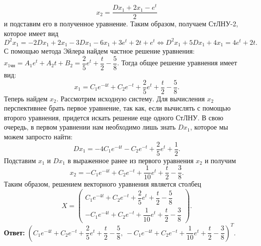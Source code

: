 \documentclass[a4paper, 12pt]{article}
\begin{document}
$$x_2 = \dfrac{Dx_1 + 2x_1 - e^t}{2}$$
и подставим его в полученное уравнение. Таким образом, получаем СтЛНУ-2, которое имеет вид
$$D^2x_1 = -2Dx_1 + 2x_1 - 3Dx_1 -6x_1 + 3e^t + 2t + e^t\Longleftrightarrow D^2x_1 + 5Dx_1 + 4x_1 = 4e^t + 2t.$$
С помощью метода Эйлера найдем частное решение уравнения: $x_{1\text{чн}} = A_1e^t + A_2t + B_2 = \dfrac{2}{5}e^t + \dfrac{t}{2} - \dfrac{5}{8}.$ Тогда общее решение уравнения имеет вид:
$$x_1 = C_1e^{-4t} + C_2e^{-t} + \dfrac{2}{5}e^t + \dfrac{t}{2} - \dfrac{5}{8}.$$
Теперь найдем $x_2$. Рассмотрим исходную систему. Для вычисления $x_2$ перспективнее брать первое уравнение, так как, если вычислять с помощью второго уравнения, придется искать решение еще одного СтЛНУ. В свою очередь, в первом уравнении нам необходимо лишь знать $Dx_1$, которое мы можем запросто найти:
$$Dx_1 = -4C_1e^{-4t} -C_2e^{-t} + \dfrac{2}{5}e^t + \dfrac{1}{2}.$$
Подставим $x_1$ и $Dx_1$ в выраженное ранее из первого уравнения $x_2$ и получим
$$x_2 = -C_1e^{-4t} + C_2e^{-t} + \dfrac{1}{10}e^t + \dfrac{t}{2} - \dfrac{3}{8}.$$
Таким образом, решением векторного уравнения является столбец $$X = \begin{pmatrix}
	C_1e^{-4t} + C_2e^{-t} + \dfrac{2}{5}e^t + \dfrac{t}{2} - \dfrac{5}{8}\\
	-C_1e^{-4t} + C_2e^{-t} + \dfrac{1}{10}e^t + \dfrac{t}{2} - \dfrac{3}{8}
\end{pmatrix}.$$
\textbf{Ответ:} $(C_1e^{-4t} + C_2e^{-t} + \dfrac{2}{5}e^t + \dfrac{t}{2} - \dfrac{5}{8},\
-C_1e^{-4t} + C_2e^{-t} + \dfrac{1}{10}e^t + \dfrac{t}{2} - \dfrac{3}{8})^T$.
\end{document}
